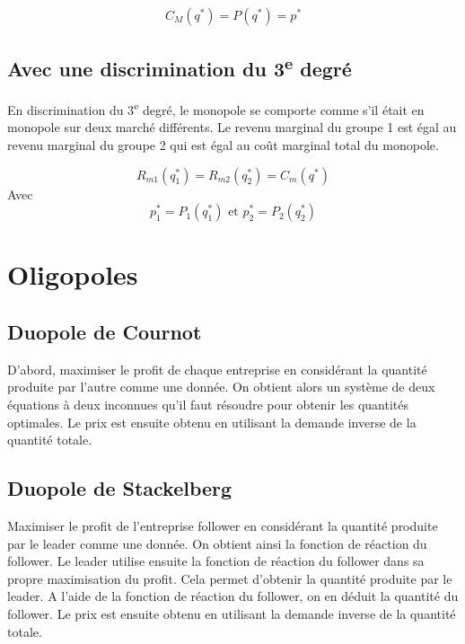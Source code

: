 \documentclass[
  a4paper,
]{book}
\theoremstyle{definition}
\theoremstyle{definition}
\theoremstyle{definition}
\theoremstyle{definition}
\theoremstyle{remark}
\begin{document}
\[C_M(q^*)=P(q^*)=p^*\]

\hypertarget{avec-une-discrimination-du-3e-degruxe9}{%
\subsection{\texorpdfstring{Avec une discrimination du 3\textsuperscript{e} degré}{Avec une discrimination du 3e degré}}\label{avec-une-discrimination-du-3e-degruxe9}}

En discrimination du 3\textsuperscript{e} degré, le monopole se comporte comme s'il était en monopole sur deux marché différents.
Le revenu marginal du groupe 1 est égal au revenu marginal du groupe 2 qui est égal au coût marginal total du monopole.

\[R_{m1}(q_1^*)=R_{m2}(q_2^*)=C_m(q^*)\]
Avec
\[p_1^*=P_1(q_1^*)\text{ et }p_2^*=P_2(q_2^*)\]

\hypertarget{oligopoles-2}{%
\section{Oligopoles}\label{oligopoles-2}}

\hypertarget{duopole-de-cournot}{%
\subsection{Duopole de Cournot}\label{duopole-de-cournot}}

D'abord, maximiser le profit de chaque entreprise en considérant la quantité produite par l'autre comme une donnée.
On obtient alors un système de deux équations à deux inconnues qu'il faut résoudre pour obtenir les quantités optimales.
Le prix est ensuite obtenu en utilisant la demande inverse de la quantité totale.

\hypertarget{duopole-de-stackelberg}{%
\subsection{Duopole de Stackelberg}\label{duopole-de-stackelberg}}

Maximiser le profit de l'entreprise follower en considérant la quantité produite par le leader comme une donnée.
On obtient ainsi la fonction de réaction du follower.
Le leader utilise ensuite la fonction de réaction du follower dans sa propre maximisation du profit.
Cela permet d'obtenir la quantité produite par le leader.
A l'aide de la fonction de réaction du follower, on en déduit la quantité du follower.
Le prix est ensuite obtenu en utilisant la demande inverse de la quantité totale.
\end{document}
